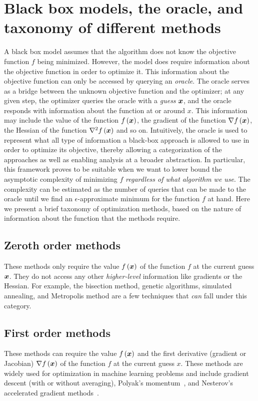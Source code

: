 \documentclass{article}
\begin{document}
\section{Black box models, the oracle, and taxonomy of different methods}
\label{blackbox}

A black box model assumes that the algorithm does not know the objective function $f$ being minimized.
However, the model does require information about the objective function in order to optimize it.
This information about the objective function can only be accessed by querying an \emph{oracle}. 
The oracle serves as a bridge between the unknown objective function and the optimizer; at any given step, the optimizer queries the oracle with a \emph{guess} ${\bm{x}}$, and the oracle responds with information about the function at or around $x$.
This information may include the value of the function $f\left({\bm{x}}\right)$, the gradient of the function $\nabla f\left({\bm{x}}\right)$, the Hessian of the function $\nabla^2 f\left({\bm{x}}\right)$ and so on.
Intuitively, the oracle is used to represent what all type of information a black-box approach is allowed to use in order to optimize its objective, thereby allowing a categorization of the approaches as well as enabling analysis at a broader abstraction.
In particular, this framework proves to be suitable when we want to lower bound the asymptotic complexity of minimizing $f$ {\em regardless of what algorithm we use}. 
The complexity can be estimated as the number of queries that can be made to the oracle until we find an $\epsilon$-approximate minimum for the function $f$ at hand. 
Here we present a brief taxonomy of optimization methods, based on the nature of information about the function that the methods require.
 
\subsection{Zeroth order methods} 
These methods only require the value $f\left({\bm{x}}\right)$ of the function $f$ at the current guess ${\bm{x}}$. 
They do not access any other \emph{higher-level} information like gradients or the Hessian. 
For example, the bisection method, genetic algorithms, simulated annealing, and Metropolis method are a few techniques that {\em can} fall under this category.

\subsection{First order methods} 
These methods can require the value $f\left({\bm{x}}\right)$ and the first derivative (gradient or Jacobian) $\nabla f\left({\bm{x}}\right)$ of the function $f$ at the current guess $x$. 
These methods are widely used for optimization in machine learning problems and include gradient descent (with or without averaging), Polyak's momentum~\cite{polyak}, and Nesterov's accelerated gradient methods~\cite{nesterov}.
\end{document}
